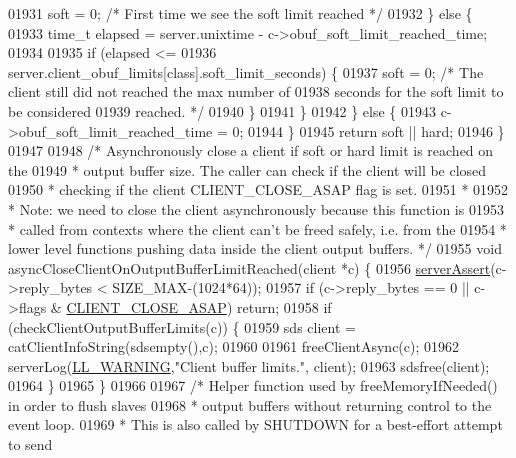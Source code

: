 \begin{DoxyCode}
{{{{{{{{{{{{{{{{{{{{01931             soft = 0; \textcolor{comment}{/* First time we see the soft limit reached */}
01932         \} \textcolor{keywordflow}{else} \{
01933             time\_t elapsed = server.unixtime - c->obuf\_soft\_limit\_reached\_time;
01934 
01935             \textcolor{keywordflow}{if} (elapsed <=
01936                 server.client\_obuf\_limits[\textcolor{keyword}{class}].soft\_limit\_seconds) \{
01937                 soft = 0; \textcolor{comment}{/* The client still did not reached the max number of}
01938 \textcolor{comment}{                             seconds for the soft limit to be considered}
01939 \textcolor{comment}{                             reached. */}
01940             \}
01941         \}
01942     \} \textcolor{keywordflow}{else} \{
01943         c->obuf\_soft\_limit\_reached\_time = 0;
01944     \}
01945     \textcolor{keywordflow}{return} soft || hard;
01946 \}
01947 
01948 \textcolor{comment}{/* Asynchronously close a client if soft or hard limit is reached on the}
01949 \textcolor{comment}{ * output buffer size. The caller can check if the client will be closed}
01950 \textcolor{comment}{ * checking if the client CLIENT\_CLOSE\_ASAP flag is set.}
01951 \textcolor{comment}{ *}
01952 \textcolor{comment}{ * Note: we need to close the client asynchronously because this function is}
01953 \textcolor{comment}{ * called from contexts where the client can't be freed safely, i.e. from the}
01954 \textcolor{comment}{ * lower level functions pushing data inside the client output buffers. */}
01955 \textcolor{keywordtype}{void} asyncCloseClientOnOutputBufferLimitReached(client *c) \{
01956     \hyperlink{server_8h_a88114b5169b4c382df6b56506285e56a}{serverAssert}(c->reply\_bytes < SIZE\_MAX-(1024*64));
01957     \textcolor{keywordflow}{if} (c->reply\_bytes == 0 || c->flags & \hyperlink{server_8h_ad6690c6231b67525b8b2057e092a8361}{CLIENT\_CLOSE\_ASAP}) \textcolor{keywordflow}{return};
01958     \textcolor{keywordflow}{if} (checkClientOutputBufferLimits(c)) \{
01959         sds client = catClientInfoString(sdsempty(),c);
01960 
01961         freeClientAsync(c);
01962         serverLog(\hyperlink{server_8h_a31229b9334bba7d6be2a72970967a14b}{LL\_WARNING},\textcolor{stringliteral}{"Client %
       buffer limits."}, client);
01963         sdsfree(client);
01964     \}
01965 \}
01966 
01967 \textcolor{comment}{/* Helper function used by freeMemoryIfNeeded() in order to flush slaves}
01968 \textcolor{comment}{ * output buffers without returning control to the event loop.}
01969 \textcolor{comment}{ * This is also called by SHUTDOWN for a best-effort attempt to send}
}}}}}}}}}}}}}}}}}}}}
\end{DoxyCode}
